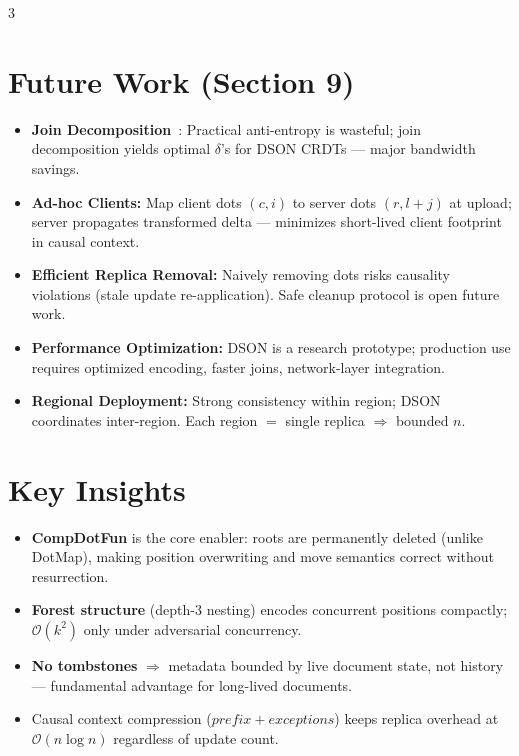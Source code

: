 \documentclass[a0,portrait]{a0poster}
\begin{document}
\begin{multicols}{3}

\section*{Future Work (Section 9)}

\begin{itemize}
  \item \textbf{Join Decomposition}~\cite{enes2019efficient}: Practical anti-entropy is wasteful; join decomposition yields optimal $\delta$'s for DSON CRDTs --- major bandwidth savings.
  \item \textbf{Ad-hoc Clients:} Map client dots $(c,i)$ to server dots $(r,l{+}j)$ at upload; server propagates transformed delta --- minimizes short-lived client footprint in causal context.
  \item \textbf{Efficient Replica Removal:} Naively removing dots risks causality violations (stale update re-application). Safe cleanup protocol is open future work.
  \item \textbf{Performance Optimization:} DSON is a research prototype; production use requires optimized encoding, faster joins, network-layer integration.
  \item \textbf{Regional Deployment:} Strong consistency within region; DSON coordinates inter-region. Each region $=$ single replica $\Rightarrow$ bounded $n$.
\end{itemize}


\color{SaddleBrown}
\section*{Key Insights}

\begin{itemize}
  \item \textbf{CompDotFun} is the core enabler: roots are permanently deleted (unlike DotMap), making position overwriting and move semantics correct without resurrection.
  \item \textbf{Forest structure} (depth-3 nesting) encodes concurrent positions compactly; $\mathcal{O}(k^2)$ only under adversarial concurrency.
  \item \textbf{No tombstones} $\Rightarrow$ metadata bounded by live document state, not history --- fundamental advantage for long-lived documents.
  \item Causal context compression ($prefix + exceptions$) keeps replica overhead at $\mathcal{O}(n\log n)$ regardless of update count.
\end{itemize}


\end{multicols}
\end{document}
